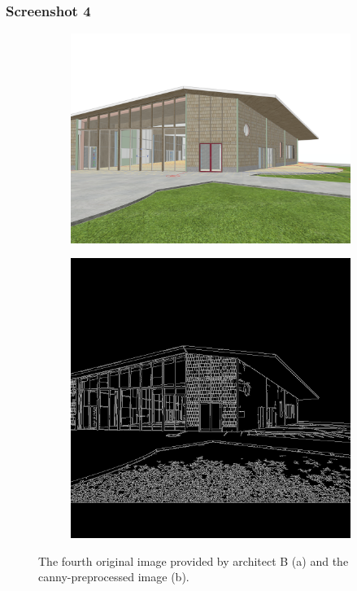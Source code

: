 \subsubsection{Screenshot 4}
\begin{figure}[H]
    \centering
    \begin{subfigure}[b]{0.3\textwidth}
        \centering
        \includegraphics[width=\textwidth]{Images/Results/Architect-B_unstructured-phase/screenshots/screenshot_4.png}
        \caption{}
        \label{A-unstructured-1-sketch}
    \end{subfigure}
    \begin{subfigure}[b]{0.3\textwidth}
        \centering 
        \includegraphics[width=\textwidth]{Images/Results/Architect-B_unstructured-phase/screenshots/screenshot_4_preprocessed.png}
        \caption{}
        \label{A-unstructured-1-sketch-prep}
    \end{subfigure}
    \caption{The fourth original image provided by architect B (a) and the canny-preprocessed image (b).}
    \label{fig:B-screenshot-4}
\end{figure}

